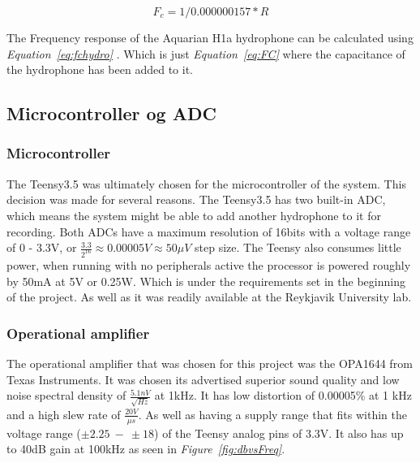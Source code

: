 \begin{equation}
F_c = 1 / 0.000000157 * R  
\label{eq:fchydro}
\end{equation}

The Frequency response of the Aquarian H1a hydrophone can be calculated using \textit{Equation~\ref{eq:fchydro}} \cite{noauthor_aquarian_nodate}. 
Which is just \textit{Equation~\ref{eq:FC}} where the capacitance of the hydrophone has been added to it.


\subsection{Microcontroller og ADC}

\subsubsection{Microcontroller}
The Teensy3.5 was ultimately chosen for the microcontroller of the system.
This decision was made for several reasons.
The Teensy3.5 has two built-in ADC, which means the system might be able to add another hydrophone to it for recording.
Both ADCs have a maximum resolution of 16bits with a voltage range of 0 - 3.3V, or $\frac{3.3}{2^{16}} \approx 0.00005V \approx 50\mu V$ step size.
The Teensy also consumes little power, when running with no peripherals active the processor is powered roughly by 50mA at 5V or 0.25W.
Which is under the requirements set in the beginning of the project.
As well as it was readily available at the Reykjavik University lab.

\subsubsection{Operational amplifier}

The operational amplifier that was chosen for this project was the OPA1644 from Texas Instruments.
It was chosen its advertised superior sound quality and low noise spectral density of $\frac{5.1nV}{\sqrt{Hz}}$ at 1kHz.
It has low distortion of 0.00005\% at 1 kHz and a high slew rate of $\frac{20V}{\mu s}$.
As well as having a supply range that fits within the voltage range ($\pm2.25~-~\pm18$) of the Teensy analog pins of 3.3V\cite{noauthor_opa164x_nodate}.
It also has up to 40dB gain at 100kHz as seen in \textit{Figure~\ref{fig:dbvsFreq}}.

